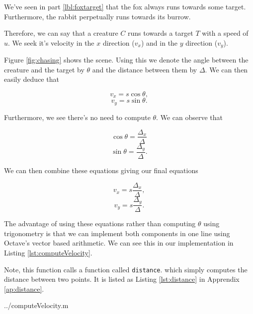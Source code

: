 We've seen in part \ref{lbl:foxtarget} that the fox always runs towards some target. Furthermore, the rabbit perpetually runs towards its burrow. 

Therefore, we can say that a creature $C$ runs towards a target $T$ with a speed of $u$. We seek it's velocity in the $x$ direction ($v_x$) and in the $y$ direction ($v_y$).





Figure \ref{fig:chasing} shows the scene. Using this we denote the angle between the creature and the target by $\theta$ and the distance between them by $\Delta$. We can then easily deduce that

$$ v_x = s\cos{\theta}, $$
$$ v_y = s\sin{\theta}. $$

Furthermore, we see there's no need to compute $\theta$. We can observe that 

$$ \cos{\theta} = \frac{\Delta_x}{\Delta}$$
$$ \sin{\theta} = \frac{\Delta_y}{\Delta}.$$

We can then combine these equations giving our final equations

$$ v_x = s \frac{\Delta_x}{\Delta},$$
$$ v_y = s \frac{\Delta_y}{\Delta}.$$

The advantage of using these equations rather than computing $\theta$ using trigonometry is that we can implement both components in one line using Octave's vector based arithmetic. We can see this in our implementation in Listing \ref{lst:computeVelocity}.

Note, this function calls a function called \texttt{distance}. which simply computes the distance between two points. It is listed as Listing \ref{lst:distance} in Apprendix \ref{ap:distance}.

  {../computeVelocity.m}
